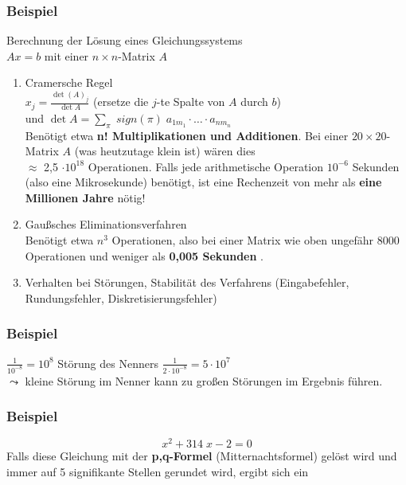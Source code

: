 \subsubsection{Beispiel}
Berechnung der Lösung eines Gleichungssystems 
\\ $ A x=b$ mit einer $n \times n$-Matrix $A$
\begin{enumerate}
\item Cramersche Regel\\
  $x_j = \frac{\det  (A)_j}{\det A}$ (ersetze die $j$-te
  Spalte von $A$ durch $b$)\\
  und $\det A = \sum_{\pi} \; sign (\pi) \; a_{1 m_1} \cdot \ldots \cdot a_{n
    m_n}$\\
  Benötigt etwa \textbf{n! Multiplikationen und Additionen}.
  Bei einer $20 \times 20$-Matrix $A$ (was
  heutzutage klein ist) wären dies \\
  $\approx$ 2,5
  $\cdot 10^{18}$ Operationen. Falls jede
  arithmetische Operation $10^{-6}$ Sekunden (also
  eine Mikrosekunde) benötigt, ist eine Rechenzeit
  von mehr als \textbf{eine Millionen Jahre} nötig!
\item Gaußsches Eliminationsverfahren\\
  Benötigt etwa $n^3$ Operationen, also bei einer Matrix wie oben
  ungefähr 8000 Operationen und weniger als \textbf{0,005 Sekunden}
  \cite[siehe auch][]{golubortega}.
\item Verhalten bei Störungen, Stabilität des Verfahrens
  (Eingabefehler, Rundungsfehler, Diskretisierungsfehler)\\
\end{enumerate}

\subsubsection{Beispiel}
$\frac{1}{10^{-8}} = 10^8$ Störung des Nenners $\frac{1}{2 \cdot 10^{-8}} = 5 \cdot
10^7$\\
$\leadsto$ kleine Störung im Nenner kann zu großen
Störungen im Ergebnis führen.
\\

\subsubsection{Beispiel}
$$x^2 + 314 \; x - 2 = 0$$
Falls diese Gleichung mit der \textbf{p,q-Formel} (Mitternachtsformel)
gelöst wird und immer auf 5 signifikante Stellen gerundet wird,
ergibt sich ein

